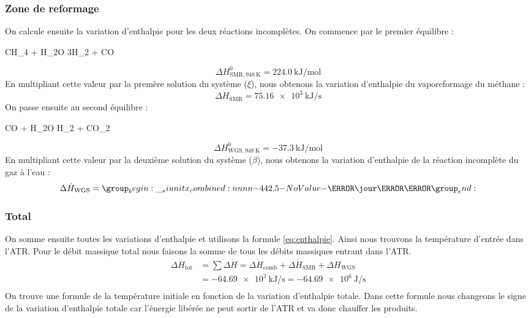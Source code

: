 \documentclass[french, a4paper, 10pt]{article}
\begin{document}
\subsubsection*{Zone de reformage}
On calcule ensuite la variation d'enthalpie pour les deux réactions incomplètes. On commence par le premier équilibre :
\begin{chemmath}
	CH_4 + H_2O \rightleftharpoons 3H_2 + CO
\end{chemmath}
\begin{equation*}\Delta H^0_{\text{SMR},\SI{948}{\kelvin}} = \SI{224.0}{\kilo\joule\per\mol}\end{equation*}
En multipliant cette valeur par la premère solution du système ($\xi$), nous obtenons la variation d'enthalpie du vaporeformage du méthane :
\begin{equation}\Delta\dot{H}_\text{SMR} = \SI{75.16e3}{\kilo\joule\per\second}\end{equation}
On passe ensuite au second équilibre :
\begin{chemmath}
	CO + H_2O \rightleftharpoons H_2 + CO_2
\end{chemmath}
\begin{equation*}\Delta H^0_{\text{WGS},\SI{948}{\kelvin}} = \SI{-37.3}{\kilo\joule\per\mol}\end{equation*}
En multipliant cette valeur par la deuxième solution du système ($\beta$), nous obtenons la variation d'enthalpie de la réaction incomplète du gaz à l'eau : 
\begin{equation}\Delta\dot{H}_\text{WGS} = \SI{-442.5}{\kilo\jour\per\second}\end{equation}

\subsubsection*{Total}
On somme ensuite toutes les variations d'enthalpie et utilisons la formule \ref{eq:enthalpie}. Ainsi nous trouvons la température d'entrée dans l'ATR. Pour le débit massique total nous faisons la somme de tous les débits massiques entrant dans l'ATR.
\begin{align}
	\Delta\dot{H}_\text{tot} &= \sum\Delta\dot{H} = \Delta\dot{H}_\text{comb} + \Delta\dot{H}_\text{SMR} + \Delta\dot{H}_\text{WGS}\\
							 &= \SI{-64.69e3}{\kilo\joule\per\second} = \SI{-64.69e6}{\joule\per\second} \\
\end{align}
On trouve une formule de la température initiale en fonction de la variation d'enthalpie totale. Dans cette formule nous changeons le signe de la variation d'enthalpie totale car l'énergie libérée ne peut sortir de l'ATR et va donc chauffer les produits.
\end{document}

